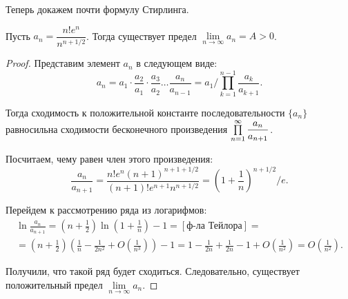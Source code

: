 \documentclass[a4paper, 12pt]{article}
\begin{document}
Теперь докажем почти формулу Стирлинга.
\begin{Statement}
Пусть $a_n = \dfrac{n!e^n}{n^{n + 1/2}}$. Тогда существует предел $\lim\limits_{n \to \infty}a_n = A > 0$.
\end{Statement}
\begin{proof}
Представим элемент $a_n$ в следующем виде:
$$
a_n = a_1 \cdot \frac{a_2}{a_1}\cdot\frac{a_3}{a_2} \ldots \frac{a_n}{a_{n-1}} = a_1 / \prod\limits_{k=1}^{n-1} \frac{a_k}{a_{k+1}}.
$$

Тогда сходимость к положительной константе последовательности $\{a_n\}$ равносильна сходимости бесконечного произведения $\prod\limits_{n=1}^{\infty} \dfrac{a_n}{a_{n+1}}$.

Посчитаем, чему равен член этого произведения:
$$
\frac{a_n}{a_{n+1}} = \frac{n!e^n (n+1)^{n+1+1/2}}{(n+1)! e^{n+1}n^{n+1/2} } = \left(1 + \frac{1}{n} \right)^{n + 1/2} / e.
$$

Перейдем к рассмотрению ряда из логарифмов:
\begin{gather*}
\ln \frac{a_n}{a_{n+1}} = \left( n + \frac{1}{2}\right)\ln\left( 1 + \frac{1}{n}\right) - 1 = [\text{ф-ла Тейлора}] = \\ =\left(n + \frac{1}{2}\right)\left( \frac{1}{n} - \frac{1}{2n^2} + O\left(\frac{1}{n^3} \right) \right) - 1 = 1 - \frac{1}{2n} + \frac{1}{2n} - 1 + O\left(\frac{1}{n^2} \right) = O\left(\frac{1}{n^2} \right).
\end{gather*}


Получили, что такой ряд будет сходиться. Следовательно, существует положительный предел $\lim\limits_{n \to \infty}a_n$.

\end{proof}
\end{document}
